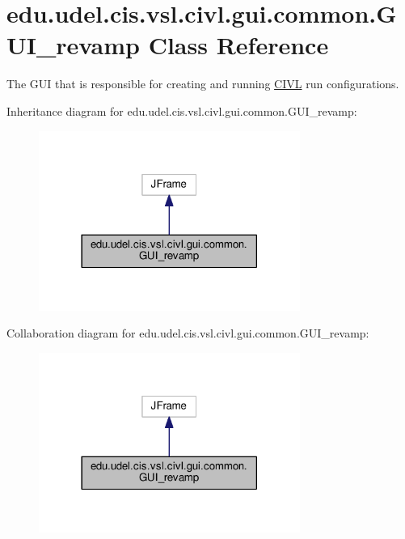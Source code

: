 \hypertarget{classedu_1_1udel_1_1cis_1_1vsl_1_1civl_1_1gui_1_1common_1_1GUI__revamp}{}\section{edu.\+udel.\+cis.\+vsl.\+civl.\+gui.\+common.\+G\+U\+I\+\_\+revamp Class Reference}
\label{classedu_1_1udel_1_1cis_1_1vsl_1_1civl_1_1gui_1_1common_1_1GUI__revamp}


The G\+U\+I that is responsible for creating and running \hyperlink{classedu_1_1udel_1_1cis_1_1vsl_1_1civl_1_1CIVL}{C\+I\+V\+L} run configurations.  




Inheritance diagram for edu.\+udel.\+cis.\+vsl.\+civl.\+gui.\+common.\+G\+U\+I\+\_\+revamp\+:
\nopagebreak
\begin{figure}[H]
\begin{center}
\leavevmode
\includegraphics[width=242pt]{classedu_1_1udel_1_1cis_1_1vsl_1_1civl_1_1gui_1_1common_1_1GUI__revamp__inherit__graph}
\end{center}
\end{figure}


Collaboration diagram for edu.\+udel.\+cis.\+vsl.\+civl.\+gui.\+common.\+G\+U\+I\+\_\+revamp\+:
\nopagebreak
\begin{figure}[H]
\begin{center}
\leavevmode
\includegraphics[width=242pt]{classedu_1_1udel_1_1cis_1_1vsl_1_1civl_1_1gui_1_1common_1_1GUI__revamp__coll__graph}
\end{center}
\end{figure}

